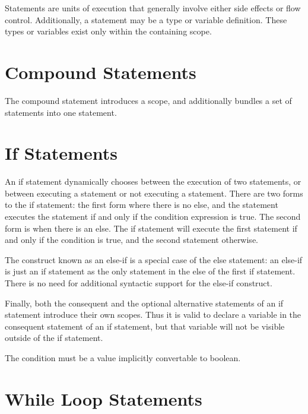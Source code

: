 \documentclass[letterpaper,12pt]{book}
\begin{document}


Statements are units of execution that generally involve either side effects or flow control. Additionally, a statement may be a type or variable definition. These types or variables exist only within the containing scope.

\section{Compound Statements}



The compound statement introduces a scope, and additionally bundles a set of statements into one statement.

\section{If Statements}



An if statement dynamically chooses between the execution of two statements, or between executing a statement or not executing a statement. There are two forms to the if statement: the first form where there is no else, and the statement executes the statement if and only if the condition expression is true. The second form is when there is an else. The if statement will execute the first statement if and only if the condition is true, and the second statement otherwise.

The construct known as an else-if is a special case of the else statement: an else-if is just an if statement as the only statement in the else of the first if statement. There is no need for additional syntactic support for the else-if construct.

Finally, both the consequent and the optional alternative statements of an if statement introduce their own scopes. Thus it is valid to declare a variable in the consequent statement of an if statement, but that variable will not be visible outside of the if statement.

The condition must be a value implicitly convertable to boolean.

\section{While Loop Statements}
\end{document}
